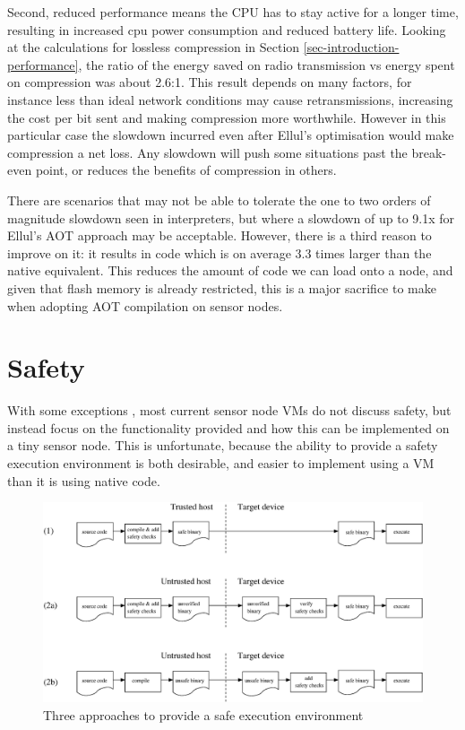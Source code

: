 Second, reduced performance means the CPU has to stay active for a longer time, resulting in increased cpu power consumption and reduced battery life. Looking at the calculations for lossless compression in Section \ref{sec-introduction-performance}, the ratio of the energy saved on radio transmission vs energy spent on compression was about 2.6:1. This result depends on many factors, for instance less than ideal network conditions may cause retransmissions, increasing the cost per bit sent and making compression more worthwhile. However in this particular case the slowdown incurred even after Ellul's optimisation would make compression a net loss. Any slowdown will push some situations past the break-even point, or reduces the benefits of compression in others.

There are scenarios that may not be able to tolerate the one to two orders of magnitude slowdown seen in interpreters, but where a slowdown of up to 9.1x for Ellul's AOT approach may be acceptable. However, there is a third reason to improve on it: it results in code which is on average 3.3 times larger than the native equivalent. This reduces the amount of code we can load onto a node, and given that flash memory is already restricted, this is a major sacrifice to make when adopting AOT compilation on sensor nodes.


\section{Safety}
\label{sec-state-of-the-art-safety}
With some exceptions \cite{Evers:2010ur}, most current sensor node VMs do not discuss safety, but instead focus on the functionality provided and how this can be implemented on a tiny sensor node. This is unfortunate, because the ability to provide a safety execution environment is both desirable, and easier to implement using a VM than it is using native code.

\begin{figure}
\centering
\includegraphics[width=\linewidth]{safe-compilation-process.eps}
\caption{Three approaches to provide a safe execution environment}
\label{fig-safe-compilation-process}
\end{figure}

